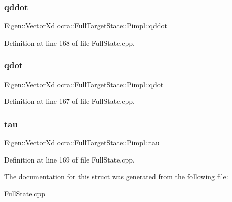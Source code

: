 \hypertarget{structocra_1_1FullTargetState_1_1Pimpl_a6eb86dcb00ed58935f11c42f030645a3}{}\label{structocra_1_1FullTargetState_1_1Pimpl_a6eb86dcb00ed58935f11c42f030645a3} 
\subsubsection{\texorpdfstring{qddot}{qddot}}
{\footnotesize\ttfamily Eigen\+::\+Vector\+Xd ocra\+::\+Full\+Target\+State\+::\+Pimpl\+::qddot}



Definition at line 168 of file Full\+State.\+cpp.

\hypertarget{structocra_1_1FullTargetState_1_1Pimpl_a2d1307a89fa37ddb50305785e7d91e68}{}\label{structocra_1_1FullTargetState_1_1Pimpl_a2d1307a89fa37ddb50305785e7d91e68} 
\subsubsection{\texorpdfstring{qdot}{qdot}}
{\footnotesize\ttfamily Eigen\+::\+Vector\+Xd ocra\+::\+Full\+Target\+State\+::\+Pimpl\+::qdot}



Definition at line 167 of file Full\+State.\+cpp.

\hypertarget{structocra_1_1FullTargetState_1_1Pimpl_aae33a52895f1ead1be869d88b3e6ff9f}{}\label{structocra_1_1FullTargetState_1_1Pimpl_aae33a52895f1ead1be869d88b3e6ff9f} 
\subsubsection{\texorpdfstring{tau}{tau}}
{\footnotesize\ttfamily Eigen\+::\+Vector\+Xd ocra\+::\+Full\+Target\+State\+::\+Pimpl\+::tau}



Definition at line 169 of file Full\+State.\+cpp.



The documentation for this struct was generated from the following file\+:\begin{DoxyCompactItemize}
\item 
\hyperlink{FullState_8cpp}{Full\+State.\+cpp}\end{DoxyCompactItemize}
